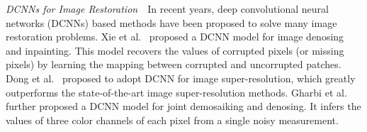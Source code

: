 
\vspace{0.15in}

\noindent\emph{DCNNs for Image Restoration}\,\,\,\, In recent years, 
deep convolutional neural networks (DCNNs) based methods have been proposed to solve 
many image restoration problems.
Xie et al.~ proposed a DCNN model for
image denosing and inpainting. This model recovers the values of corrupted
pixels (or missing pixels) by learning the mapping between corrupted and
uncorrupted patches. Dong et al.~ proposed to adopt
DCNN for image super-resolution, which greatly outperforms the state-of-the-art
image super-resolution methods. Gharbi et al.~ further
proposed a DCNN model for joint demosaiking and denosing. It infers
the values of three color channels of each pixel from a single noisy
measurement.


